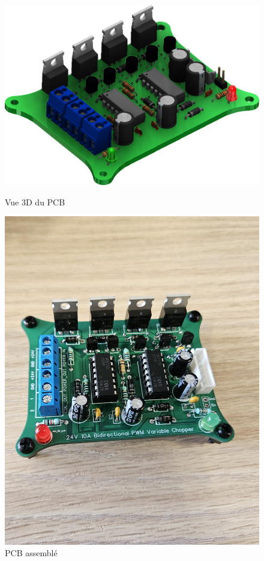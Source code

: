 \documentclass{article}
\begin{document}
\begin{figure}[H]
    \centering
    \begin{minipage}{0.45\textwidth}
        \centering
        \includegraphics[width=\linewidth]{Images/pcb_3d.png}
        \caption{Vue 3D du PCB}
        \label{fig:PCB_3d-1}
    \end{minipage}\hfill
    \begin{minipage}{0.45\textwidth}
        \centering
        \includegraphics[width=\linewidth]{Images/pcb_reel.jpg}
        \caption{PCB assemblé}
        \label{fig:PCB_3d-2}
    \end{minipage}\hfill
\end{figure}
\end{document}
